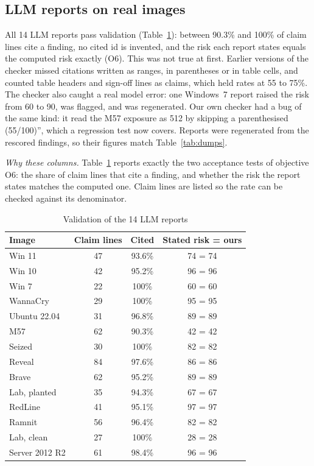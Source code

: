 \subsection{LLM reports on real images}
All 14 LLM reports pass validation (Table~\ref{tab:llm}): between 90.3\% and 100\% of claim lines cite a finding,
no cited id is invented, and the risk each report states equals the computed risk exactly (O6). This was not
true at first. Earlier versions of the checker missed citations written as ranges, in parentheses or in table
cells, and counted table headers and sign-off lines as claims, which held rates at 55 to 75\%. The checker also
caught a real model error: one Windows~7 report raised the risk from 60 to 90, was flagged, and was regenerated.
Our own checker had a bug of the same kind: it read the M57 exposure as 512 by skipping a parenthesised
(55/100)'', which a regression test now covers. Reports were regenerated
from the rescored findings, so their figures match Table~\ref{tab:dumps}.

\textit{Why these columns.} Table~\ref{tab:llm} reports exactly the two acceptance tests of objective O6: the
share of claim lines that cite a finding, and whether the risk the report states matches the computed one.
Claim lines are listed so the rate can be checked against its denominator.

\begin{table}[t]
\centering
\caption{Validation of the 14 LLM reports}
\label{tab:llm}
\footnotesize
\begin{tabular}{@{}lccc@{}}
\toprule
Image & Claim lines & Cited & Stated risk = ours\\
\midrule
Win 11 & 47 & 93.6\% & 74 = 74\\
Win 10 & 42 & 95.2\% & 96 = 96\\
Win 7 & 22 & 100\% & 60 = 60\\
WannaCry & 29 & 100\% & 95 = 95\\
Ubuntu 22.04 & 31 & 96.8\% & 89 = 89\\
M57 & 62 & 90.3\% & 42 = 42\\
Seized & 30 & 100\% & 82 = 82\\
Reveal & 84 & 97.6\% & 86 = 86\\
Brave & 62 & 95.2\% & 89 = 89\\
Lab, planted & 35 & 94.3\% & 67 = 67\\
RedLine & 41 & 95.1\% & 97 = 97\\
Ramnit & 56 & 96.4\% & 82 = 82\\
Lab, clean & 27 & 100\% & 28 = 28\\
Server 2012 R2 & 61 & 98.4\% & 96 = 96\\
\bottomrule
\end{tabular}
\end{table}

